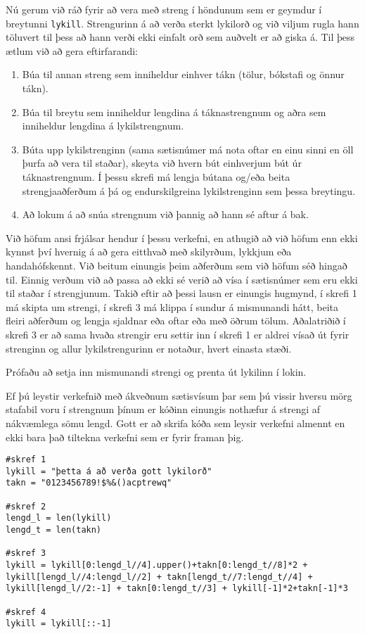 \begin{exercise}\label{str8}
Nú gerum við ráð fyrir að vera með streng í höndunum sem er geymdur í breytunni \texttt{lykill}.
Strengurinn á að verða sterkt lykilorð og við viljum rugla hann töluvert til þess að hann verði ekki einfalt orð sem auðvelt er að giska á.
Til þess ætlum við að gera eftirfarandi:
\begin{enumerate}
	\item Búa til annan streng sem inniheldur einhver tákn (tölur, bókstafi og önnur tákn).
	\item Búa til breytu sem inniheldur lengdina á táknastrengnum og aðra sem inniheldur lengdina á lykilstrengnum.
	\item Búta upp lykilstrenginn (sama sætisnúmer má nota oftar en einu sinni en öll þurfa að vera til staðar), skeyta við hvern bút einhverjum bút úr táknastrengnum.
		Í þessu skrefi má lengja bútana og/eða beita strengjaaðferðum á þá og endurskilgreina lykilstrenginn sem þessa breytingu.
	\item Að lokum á að snúa strengnum við þannig að hann sé aftur á bak.
\end{enumerate}
\end{exercise}
\begin{Answer}[ref={str8}]
Við höfum ansi frjálsar hendur í þessu verkefni, en athugið að við höfum enn ekki kynnst því hvernig á að gera eitthvað með skilyrðum, lykkjum eða handahófskennt.
Við beitum einungis þeim aðferðum sem við höfum séð hingað til.
Einnig verðum við að passa að ekki sé verið að vísa í sætisnúmer sem eru ekki til staðar í strengjunum.
Takið eftir að þessi lausn er einungis hugmynd, í skrefi 1 má skipta um strengi, í skrefi 3 má klippa í sundur á mismunandi hátt, beita fleiri aðferðum og lengja sjaldnar eða oftar eða með öðrum tölum.
Aðalatriðið í skrefi 3 er að sama hvaða strengir eru settir inn í skrefi 1 er aldrei vísað út fyrir strenginn og allur lykilstrengurinn er notaður, hvert einasta stæði.

Prófaðu að setja inn mismunandi strengi og prenta út lykilinn í lokin.

Ef þú leystir verkefnið með ákveðnum sætisvísum þar sem þú vissir hversu mörg stafabil voru í strengnum þínum er kóðinn einungis nothæfur á strengi af nákvæmlega sömu lengd.
Gott er að skrifa kóða sem leysir verkefni almennt en ekki bara það tiltekna verkefni sem er fyrir framan þig.
\begin{lstlisting}
#skref 1
lykill = "þetta á að verða gott lykilorð"
takn = "0123456789!$%&()acptrewq" 

#skref 2 
lengd_l = len(lykill)
lengd_t = len(takn)

#skref 3
lykill = lykill[0:lengd_l//4].upper()+takn[0:lengd_t//8]*2 + lykill[lengd_l//4:lengd_l//2] + takn[lengd_t//7:lengd_t//4] + lykill[lengd_l//2:-1] + takn[0:lengd_t//3] + lykill[-1]*2+takn[-1]*3 

#skref 4
lykill = lykill[::-1]\end{lstlisting}
\end{Answer}
